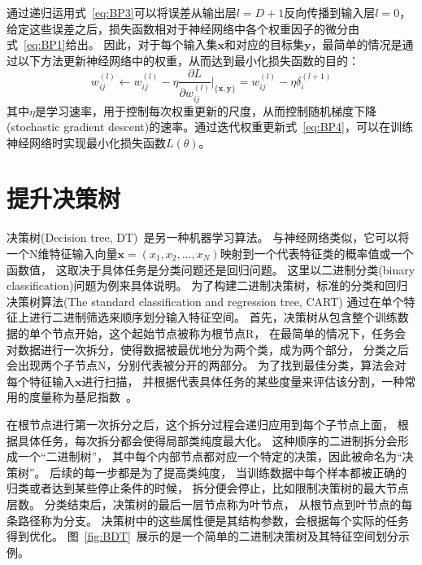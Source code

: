 通过递归运用式~\ref{eq:BP3}可以将误差从输出层$l=D+1$反向传播到输入层$l=0$，
给定这些误差之后，损失函数相对于神经网络中各个权重因子的微分由式~\ref{eq:BP1}给出。
因此，对于每个输入集$\boldsymbol{x}$和对应的目标集$\boldsymbol{y}$，最简单的情况是通过以下方法更新神经网络中的权重，从而达到最小化损失函数的目的：
\begin{equation} 
\label{eq:BP4}	
w_{ij}^{(l)} \leftarrow w_{ij}^{(l)} - \eta \frac{\partial L}{\partial w_{ij}^{(l)}} \bigg\rvert_{\{\boldsymbol{x},\boldsymbol{y}\}} = w_{ij}^{(l)} - \eta \delta_{i}^{(l+1)}
\end{equation}
其中$\eta$是学习速率，用于控制每次权重更新的尺度，从而控制随机梯度下降(stochastic gradient descent)的速率。通过迭代权重更新式~\ref{eq:BP4}，可以在训练神经网络时实现最小化损失函数$L(\theta)$。


\section{提升决策树}
\label{sec:BDT}

决策树(Decision tree, DT)~\cite{BDT2,BDT1}是另一种机器学习算法。
与神经网络类似，它可以将一个N维特征输入向量$\boldsymbol{x}=(x_1,x_2,	\dots,x_N)$映射到一个代表特征类的概率值或一个函数值，
这取决于具体任务是分类问题还是回归问题。
这里以二进制分类(binary classification)问题为例来具体说明。
为了构建二进制决策树，标准的分类和回归决策树算法(The standard classification and regression tree, CART)
通过在单个特征上进行二进制筛选来顺序划分输入特征空间。
首先，决策树从包含整个训练数据的单个节点开始，这个起始节点被称为根节点R，
在最简单的情况下，任务会对数据进行一次拆分，使得数据被最优地分为两个类，成为两个部分，
分类之后会出现两个子节点N，分别代表被分开的两部分。
为了找到最佳分类，算法会对每个特征输入$\boldsymbol{x}$进行扫描，
并根据代表具体任务的某些度量来评估该分割，一种常用的度量称为基尼指数~\cite{BDT1}。

在根节点进行第一次拆分之后，这个拆分过程会递归应用到每个子节点上面，
根据具体任务，每次拆分都会使得局部类纯度最大化。
这种顺序的二进制拆分会形成一个“二进制树”，
其中每个内部节点都对应一个特定的决策，因此被命名为“决策树”。
后续的每一步都是为了提高类纯度，
当训练数据中每个样本都被正确的归类或者达到某些停止条件的时候，
拆分便会停止，比如限制决策树的最大节点层数。
分类结束后，决策树的最后一层节点称为叶节点，
从根节点到叶节点的每条路径称为分支。
决策树中的这些属性便是其结构参数，会根据每个实际的任务得到优化。
图~\ref{fig:BDT}~展示的是一个简单的二进制决策树及其特征空间划分示例。

